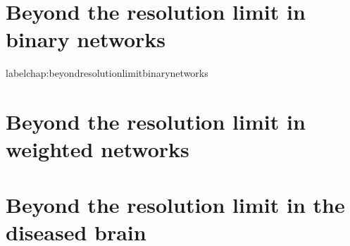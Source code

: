 \chapter{Beyond the resolution limit in binary networks}label{chap:beyondresolutionlimitbinarynetworks}


\chapter{Beyond the resolution limit in weighted networks}\label{chap:beyondresolutionlimitweightednetworks}


% 

\chapter{Beyond the resolution limit in the diseased brain}






% 
% 
%


